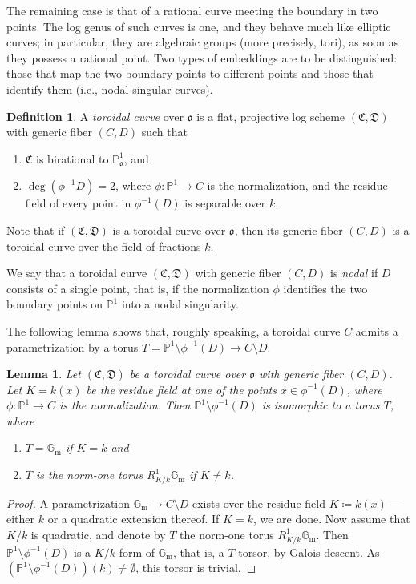 \documentclass[a4paper, twoside, 11pt]{amsart}
\newtheorem{lemma}[theorem]{Lemma}
\theoremstyle{definition}
\newtheorem{definition}[theorem]{Definition}
\newcommand{\mC}{\mathfrak{C}}
\newcommand{\mD}{\mathfrak{D}}
\newcommand{\fo}{\mathfrak{o}}
\newcommand{\PP}{\mathbb{P}}
\newcommand{\Gm}{\mathbb{G}_\mathrm{m}}
\begin{document}
The remaining case is that of a rational curve meeting the boundary in two points. The log genus of such curves is one, and they behave much like elliptic curves; in particular, they are algebraic groups (more precisely, tori), as soon as they possess a rational point.
Two types of embeddings are to be distinguished: those that map the two boundary points to different points and those that identify them (i.e., nodal singular curves). 

\begin{definition}
	A \emph{toroidal curve} over $\fo$ is a flat, projective log scheme $(\mC,\mD)$ with generic fiber $(C,D)$ such that
	\begin{enumerate}
		\item $\mC$ is birational to $\PP^1_\fo$, and
		\item $\deg(\phi^{-1}{D}) = 2$, where $\phi\colon \PP^1\to C$ is the normalization, and the residue field of every point in $\phi^{-1}(D)$ is separable over $k$.
	\end{enumerate}
	Note that if $(\mC,\mD)$ is a toroidal curve over $\fo$, then its generic fiber $(C,D)$ is a toroidal curve over the field of fractions $k$.

	We say that a toroidal curve $(\mC,\mD)$ with generic fiber $(C,D)$ is \emph{nodal} if $D$ consists of a single point, that is, if the normalization $\phi$ identifies the two boundary points on $\PP^1$ into a nodal singularity.
\end{definition}

The following lemma shows that, roughly speaking, a toroidal curve $C$ admits a parametrization by a torus $T = \PP^1\setminus \phi^{-1}(D) \to C\setminus D$.

\begin{lemma}\label{le:torus-para-rational}
 Let $(\mC,\mD)$ be a toroidal curve over $\fo$ with generic fiber $(C,D)$. Let $K=k(x)$ be the residue field at one of the points $x\in\phi^{-1}(D)$, where $\phi\colon \PP^1\to C$ is the normalization. Then $\PP^1\setminus \phi^{-1}(D)$ is isomorphic to a torus $T$, where
 \begin{enumerate}
	\item $T = \Gm$ if $K=k$ and
	\item $T$ is the norm-one torus $R^1_{K/k}\Gm$ if $K\ne k$.
 \end{enumerate}
\end{lemma}
\begin{proof}
A parametrization $\Gm\to C\setminus D$ exists over the residue field $K\coloneq k(x)$ --- either $k$ or a quadratic extension thereof. If $K=k$, we are done.
Now assume that $K/k$ is quadratic, and denote by $T$ the norm-one torus $R^1_{K/k}\Gm$.
Then $\PP^1\setminus \phi^{-1}(D)$ is a $K/k$-form of $\Gm$, that is, a $T$-torsor, by Galois descent.
As $(\PP^1\setminus \phi^{-1}(D))(k)\neq\emptyset$, this torsor is trivial.
\end{proof}
\end{document}
